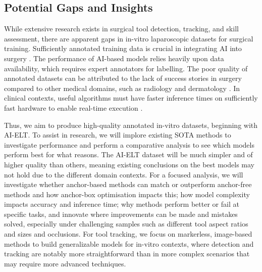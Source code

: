 \subsection{Potential Gaps and Insights}

While extensive research exists in surgical tool detection, tracking, and skill assessment, there are apparent gaps in in-vitro laparoscopic datasets for surgical training. Sufficiently annotated training data is crucial in integrating AI into surgery \cite{ali2023comprehensivesurveyrecentdeep}. The performance of AI-based models relies heavily upon data availability, which requires expert annotators for labelling. The poor quality of annotated datasets can be attributed to the lack of success stories in surgery compared to other medical domains, such as radiology and dermatology \cite{maier-hein_surgical_2022}. In clinical contexts, useful algorithms must have faster inference times on sufficiently fast hardware to enable real-time execution \cite{ali2023comprehensivesurveyrecentdeep}.

Thus, we aim to produce high-quality annotated in-vitro datasets, beginning with AI-ELT. To assist in research, we will implore existing SOTA methods to investigate performance and perform a comparative analysis to see which models perform best for what reasons. The AI-ELT dataset will be much simpler and of higher quality than others, meaning existing conclusions on the best models may not hold due to the different domain contexts. For a focused analysis, we will investigate whether anchor-based methods can match or outperform anchor-free methods and how anchor-box optimisation impacts this; how model complexity impacts accuracy and inference time; why methods perform better or fail at specific tasks, and innovate where improvements can be made and mistakes solved, especially under challenging samples such as different tool aspect ratios and sizes and occlusions. For tool tracking, we focus on markerless, image-based methods to build generalizable models for in-vitro contexts, where detection and tracking are notably more straightforward than in more complex scenarios that may require more advanced techniques.
